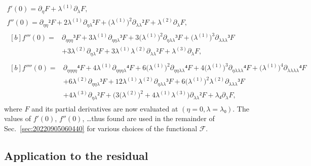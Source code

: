 \documentclass[12pt, final]{scrartcl}
\theoremstyle{definition}
\newcommand{\order}[2][1]{#2^{(#1)}}
\begin{document}
\begin{gather}
  \label{eq:20220107060454}
  f'(0) = ∂_{η} F + \order[1]\lambda ∂_{\lambda} F,\\
  \label{eq:20220107124311}
  f''(0) = ∂_{ηη}² F + 2 \order[1]\lambda ∂_{η\lambda}² F + \bigl( \order[1]\lambda \bigr)^2 ∂_{\lambda\lambda}² F + \order[2]\lambda ∂_{\lambda} F,\\
  \label{eq:20220107060500}
  \begin{aligned}[b]
    f'''(0) ={}
    & ∂_{ηηη}³ F + 3 \order[1]\lambda ∂_{ηη\lambda}³ F + 3 \bigl( \order[1]\lambda \bigr)^2 ∂_{η\lambda\lambda}³ F + \bigl( \order[1]\lambda \bigr)^3 ∂_{\lambda\lambda\lambda}³ F\\
    & + 3 \order[2]\lambda ∂_{η\lambda}² F + 3 \order[1]\lambda \order[2]\lambda ∂_{\lambda\lambda}² F + \order[3]\lambda ∂_{\lambda} F,
  \end{aligned}\\
  \label{eq:20220602185935}
  \begin{aligned}[b]
    f''''(0) ={}
    & ∂_{ηηηη}⁴F + 4 \order[1]\lambda ∂_{ηηη\lambda}⁴ F + 6 \bigl( \order[1]\lambda \bigr)^2 ∂_{ηη\lambda\lambda}⁴ F + 4 \bigl( \order[1]\lambda \bigr)^3 ∂_{η\lambda\lambda\lambda}⁴ F + \bigl( \order[1]\lambda \bigr)^4 ∂_{\lambda\lambda\lambda\lambda}⁴ F\\
    & + 6 \order[2]\lambda ∂_{ηη\lambda}³ F + 12 \order[1]\lambda \order[2]\lambda ∂_{η\lambda\lambda}³ F + 6 \bigl( \order[1]\lambda \bigr)^2 \order[2]\lambda ∂_{\lambda\lambda\lambda}³ F\\
    & + 4 \order[3]\lambda ∂_{η\lambda}² F + \bigl(3 \bigl( \order[2]\lambda \bigr)^2 + 4 \order[1]\lambda \order[3]\lambda\bigr) ∂_{\lambda\lambda}² F + \lambda₄ ∂_{\lambda} F,
  \end{aligned}
\end{gather}
where $F$ and its partial derivatives are now evaluated at
$(η = 0, \lambda = \lambda₀)$. The values of $f'(0)$, $f''(0)$, \dots thus found are
used in the remainder of Sec.~\ref{sec:20220905060440} for various choices of
the functional $\mathcal F$.

\subsection{Application to the residual}
\label{sec:20211112182000}
%
\end{document}
